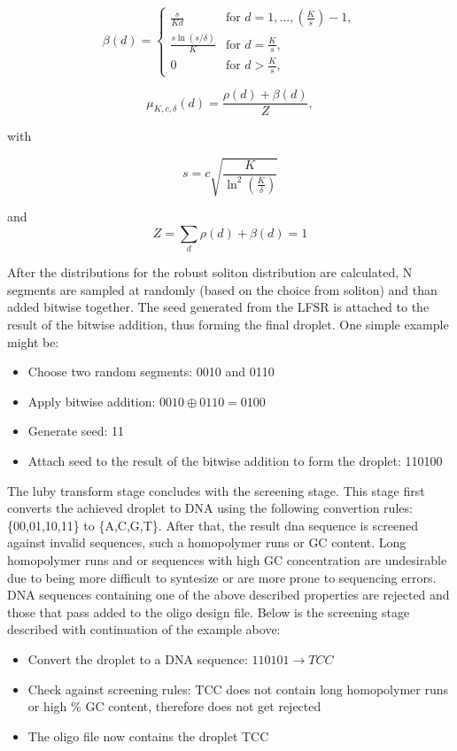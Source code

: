 \documentclass[12pt]%
{article}
\begin{document}
\[
\beta(d) = 
\begin{cases} 
\frac{s}{Kd} & \text{for } d = 1, \dots, \left(\frac{K}{s}\right) - 1, \\
\frac{s \ln(s/\delta)}{K} & \text{for } d = \frac{K}{s}, \\
0 & \text{for } d > \frac{K}{s},
\end{cases}
\]


\[
\mu_{K,c,\delta}(d) = \frac{\rho(d) + \beta(d)}{Z},
\]

with 

\[
s = c \sqrt{\frac{K}{\ln^2\left(\frac{K}{\delta}\right)}} \]

and 
\[
Z = \sum_{d} \rho(d) + \beta(d) = 1
\]


After the distributions for the robust soliton distribution are calculated, N segments are sampled at randomly (based on the choice from soliton) and  than added bitwise together. The seed generated from the LFSR is attached to the result of the bitwise addition, thus forming the final droplet. One simple example might be:


\begin{itemize}
\item Choose two random segments: 0010 and 0110
\item Apply bitwise addition: \( 0010 \oplus 0110 = 0100 \)
\item Generate seed: 11
\item Attach seed to the result of the bitwise addition to form the droplet: 110100
\end{itemize}
The luby transform stage concludes with the screening stage. This stage first converts the achieved droplet to DNA using the following convertion rules: \{00,01,10,11\} to \{A,C,G,T\}. After that, the result dna sequence is screened against invalid sequences, such a homopolymer runs or GC content. Long homopolymer runs and or sequences with high GC concentration are undesirable \cite{erlich2017dna} due to being more difficult to syntesize or are more prone to sequencing errors. DNA sequences containing one of the above described properties are rejected and those that pass added to the oligo design file. Below is the screening stage described with continuation of the example above:

\begin{itemize}
\item Convert the droplet to a DNA sequence: $110101 \rightarrow TCC$
\item Check against screening rules: TCC does not contain long homopolymer runs or high \% GC content, therefore does not get rejected
\item The oligo file now contains the droplet TCC
\end{itemize}
\end{document}
